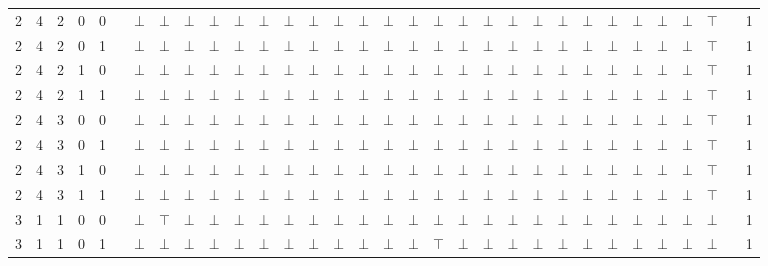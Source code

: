 \documentclass[12pt]{extarticle}
\begin{document}
\begin{landscape}
\begin{tiny}
\begin{longtable}[c]{llllllllllllllllllllllllllllllll}
2 & 4 & 2 & 0 & 0 &  & $\bot$ & $\bot$ & $\bot$ & $\bot$ & $\bot$ & $\bot$ & $\bot$ & $\bot$ & $\bot$ & $\bot$ & $\bot$ & $\bot$ & $\bot$ & $\bot$ & $\bot$ & $\bot$ & $\bot$ & $\bot$ & $\bot$ & $\bot$ & $\bot$ & $\bot$ & $\bot$ & $\top$ &  & 1 \\
2 & 4 & 2 & 0 & 1 &  & $\bot$ & $\bot$ & $\bot$ & $\bot$ & $\bot$ & $\bot$ & $\bot$ & $\bot$ & $\bot$ & $\bot$ & $\bot$ & $\bot$ & $\bot$ & $\bot$ & $\bot$ & $\bot$ & $\bot$ & $\bot$ & $\bot$ & $\bot$ & $\bot$ & $\bot$ & $\bot$ & $\top$ &  & 1 \\
2 & 4 & 2 & 1 & 0 &  & $\bot$ & $\bot$ & $\bot$ & $\bot$ & $\bot$ & $\bot$ & $\bot$ & $\bot$ & $\bot$ & $\bot$ & $\bot$ & $\bot$ & $\bot$ & $\bot$ & $\bot$ & $\bot$ & $\bot$ & $\bot$ & $\bot$ & $\bot$ & $\bot$ & $\bot$ & $\bot$ & $\top$ &  & 1 \\
2 & 4 & 2 & 1 & 1 &  & $\bot$ & $\bot$ & $\bot$ & $\bot$ & $\bot$ & $\bot$ & $\bot$ & $\bot$ & $\bot$ & $\bot$ & $\bot$ & $\bot$ & $\bot$ & $\bot$ & $\bot$ & $\bot$ & $\bot$ & $\bot$ & $\bot$ & $\bot$ & $\bot$ & $\bot$ & $\bot$ & $\top$ &  & 1 \\
2 & 4 & 3 & 0 & 0 &  & $\bot$ & $\bot$ & $\bot$ & $\bot$ & $\bot$ & $\bot$ & $\bot$ & $\bot$ & $\bot$ & $\bot$ & $\bot$ & $\bot$ & $\bot$ & $\bot$ & $\bot$ & $\bot$ & $\bot$ & $\bot$ & $\bot$ & $\bot$ & $\bot$ & $\bot$ & $\bot$ & $\top$ &  & 1 \\
2 & 4 & 3 & 0 & 1 &  & $\bot$ & $\bot$ & $\bot$ & $\bot$ & $\bot$ & $\bot$ & $\bot$ & $\bot$ & $\bot$ & $\bot$ & $\bot$ & $\bot$ & $\bot$ & $\bot$ & $\bot$ & $\bot$ & $\bot$ & $\bot$ & $\bot$ & $\bot$ & $\bot$ & $\bot$ & $\bot$ & $\top$ &  & 1 \\
2 & 4 & 3 & 1 & 0 &  & $\bot$ & $\bot$ & $\bot$ & $\bot$ & $\bot$ & $\bot$ & $\bot$ & $\bot$ & $\bot$ & $\bot$ & $\bot$ & $\bot$ & $\bot$ & $\bot$ & $\bot$ & $\bot$ & $\bot$ & $\bot$ & $\bot$ & $\bot$ & $\bot$ & $\bot$ & $\bot$ & $\top$ &  & 1 \\
2 & 4 & 3 & 1 & 1 &  & $\bot$ & $\bot$ & $\bot$ & $\bot$ & $\bot$ & $\bot$ & $\bot$ & $\bot$ & $\bot$ & $\bot$ & $\bot$ & $\bot$ & $\bot$ & $\bot$ & $\bot$ & $\bot$ & $\bot$ & $\bot$ & $\bot$ & $\bot$ & $\bot$ & $\bot$ & $\bot$ & $\top$ &  & 1 \\
3 & 1 & 1 & 0 & 0 &  & $\bot$ & $\top$ & $\bot$ & $\bot$ & $\bot$ & $\bot$ & $\bot$ & $\bot$ & $\bot$ & $\bot$ & $\bot$ & $\bot$ & $\bot$ & $\bot$ & $\bot$ & $\bot$ & $\bot$ & $\bot$ & $\bot$ & $\bot$ & $\bot$ & $\bot$ & $\bot$ & $\bot$ &  & 1 \\
3 & 1 & 1 & 0 & 1 &  & $\bot$ & $\bot$ & $\bot$ & $\bot$ & $\bot$ & $\bot$ & $\bot$ & $\bot$ & $\bot$ & $\bot$ & $\bot$ & $\bot$ & $\top$ & $\bot$ & $\bot$ & $\bot$ & $\bot$ & $\bot$ & $\bot$ & $\bot$ & $\bot$ & $\bot$ & $\bot$ & $\bot$ &  & 1 \\

\end{longtable}
\end{tiny}
\end{landscape}
\end{document}
